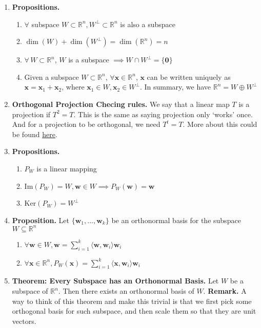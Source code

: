 \documentclass[oneside, 12pt]{book}
\newcommand{\settag}[1]{\renewcommand{\theenumi}{#1}}
\newcommand{\R}{\mathbb{R}}
\newcommand{\tbf}[1]{\textbf{#1}}
\newcommand{\para}[1]{\item \tbf{#1}}
\newcommand{\vw}{\mathbf{w}}
\newcommand{\vx}{\mathbf{x}}
\newcommand{\vzero}{\mathbf{0}}
\begin{document}
\begin{enumerate}
    \settag{4.4.3}
    \para{Propositions.}
    \begin{enumerate}
        \item $\forall$ subspace $W \subset \R^n, W^\perp\subset \R^n$ is also a subspace
        \item $\dim(W) + \dim(W^\perp) = \dim(\R^n) = n$
        \item $\forall\, W\subset \R^n$, $W$ is a subspace $\implies W \cap W^\perp = \{\vzero\}$
        \item Given a subspace $W\subset \R^n$, $\forall \vx \in \R^n$, $\vx$ can be written 
        uniquely as $\vx = \vx_1 + \vx_2$, where $\vx_1 \in W, \vx_2 \in W^\perp$. In summary, 
        we have $\R^n = W \oplus W^\perp$
    \end{enumerate}
    
    \settag{4.4.5*}
    \para{Orthogonal Projection Checing rules.} We say that a linear map $T$ is a projection if
    $T^2 = T$. This is the same as saying projection only `works' once. And for a projection to be
    orthogonal, we need $T^t = T$. More about this could be found \href{https://en.wikipedia.org/wiki/Projection_(linear_algebra)#Orthogonal_projection}{here}.

    \settag{4.4.5}
    \para{Propositions.}
    \begin{enumerate}
        \item $P_W$ is a linear mapping
        \item Im$(P_W) = W, \vw \in W \implies P_W(\vw) = \vw$
        \item Ker$(P_W) = W^\perp$
    \end{enumerate}
    
    \settag{4.4.6}
    \para{Proposition.} Let $\{\vw_1,...,\vw_k\}$ be an orthonormal basis for the subspace $W \subseteq \R^n$
    \begin{enumerate}
        \item $\forall \vw \in W, \vw = \sum_{i = 1}^k \langle \vw,\vw_i \rangle \vw_i$
        \item $\forall \vx \in \R^n, P_W(\vx) = \sum_{i = 1}^k \langle \vx,\vw_i \rangle \vw_i$
    \end{enumerate}
    
    \settag{4.4.9}
    \para{Theorem: Every Subspace has an Orthonormal Basis.} Let $W$ be a subspace of $\R^n$. 
    Then there exists an orthonormal basis of $W$. \newline 
    \textbf{Remark.} A way to think of this theorem and make this trivial is that we first 
    pick some orthogonal basis for such subspace, and then scale them so that they are unit vectors.
    

\end{enumerate}
\end{document}

